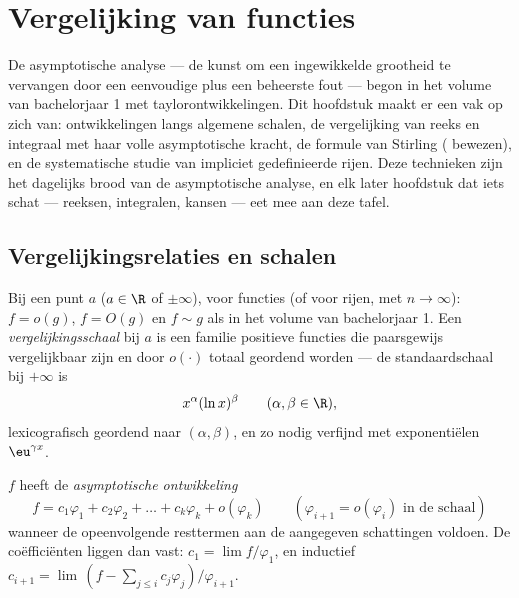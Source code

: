 \chapter{Vergelijking van functies}\label{ch:b2:comparison}

De asymptotische analyse --- de kunst om een ingewikkelde grootheid
te vervangen door een eenvoudige plus een beheerste fout --- begon
in het volume van bachelorjaar 1 met taylorontwikkelingen. Dit
hoofdstuk maakt er een vak op zich van: ontwikkelingen langs
algemene schalen, de vergelijking van reeks en integraal met haar
volle asymptotische kracht, de formule van Stirling (
bewezen), en de systematische studie van impliciet gedefinieerde
rijen. Deze technieken zijn het dagelijks brood van de
asymptotische analyse, en elk later hoofdstuk dat iets schat ---
reeksen, integralen, kansen --- eet mee aan deze tafel.

\section{Vergelijkingsrelaties en schalen}

\begin{definition}\label{def:b2:comparison:landau}
Bij een punt $a$ ($a \in \R$ of $\pm\infty$), voor functies (of
voor rijen, met $n \to \infty$): $f = o(g)$, $f = O(g)$ en $f \sim
g$ als in het volume van bachelorjaar 1. Een
\emph{vergelijkingsschaal} bij $a$ is
een familie positieve functies die paarsgewijs vergelijkbaar zijn
en door $o(\cdot)$ totaal geordend worden --- de standaardschaal
bij $+\infty$ is
\[
x^{\alpha} (\ln x)^{\beta}
\qquad (\alpha, \beta \in \R),
\]
lexicografisch geordend naar $(\alpha, \beta)$, en zo nodig
verfijnd met exponentiëlen $\eu^{\gamma x}$.
\end{definition}

\begin{definition}\label{def:b2:comparison:expansion}
$f$ heeft de \emph{asymptotische ontwikkeling}
\[
f = c_1 \varphi_1 + c_2\varphi_2 + \dots + c_k \varphi_k +
o(\varphi_k)
\qquad (\varphi_{i+1} = o(\varphi_i) \text{ in de schaal})
\]
wanneer de opeenvolgende resttermen aan de aangegeven schattingen
voldoen. De coëfficiënten liggen dan vast: $c_1 = \lim
f/\varphi_1$, en inductief $c_{i+1} = \lim\,(f - \sum_{j \leq i}
c_j\varphi_j)/\varphi_{i+1}$.
\end{definition}

